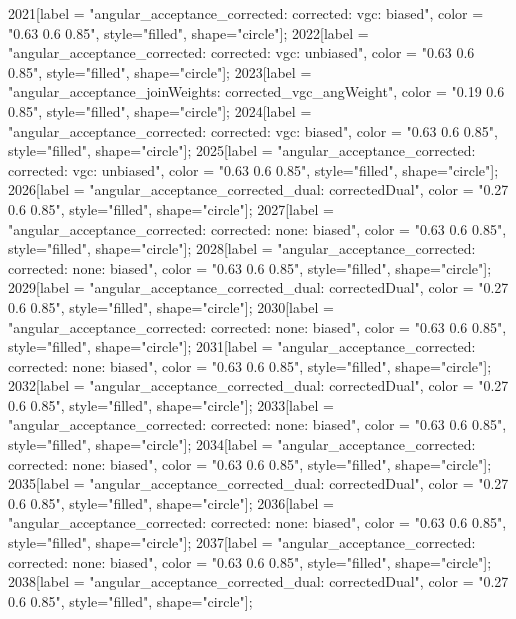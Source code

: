 {	2021[label = "angular_acceptance_corrected\nangacc: corrected\ncsp: vgc\ntrigger: biased", color = "0.63 0.6 0.85", style="filled", shape="circle"];
	2022[label = "angular_acceptance_corrected\nangacc: corrected\ncsp: vgc\ntrigger: unbiased", color = "0.63 0.6 0.85", style="filled", shape="circle"];
	2023[label = "angular_acceptance_joinWeights\nwflag: corrected_vgc_angWeight", color = "0.19 0.6 0.85", style="filled", shape="circle"];
	2024[label = "angular_acceptance_corrected\nangacc: corrected\ncsp: vgc\ntrigger: biased", color = "0.63 0.6 0.85", style="filled", shape="circle"];
	2025[label = "angular_acceptance_corrected\nangacc: corrected\ncsp: vgc\ntrigger: unbiased", color = "0.63 0.6 0.85", style="filled", shape="circle"];
	2026[label = "angular_acceptance_corrected_dual\nstep: correctedDual", color = "0.27 0.6 0.85", style="filled", shape="circle"];
	2027[label = "angular_acceptance_corrected\nangacc: corrected\ncsp: none\ntrigger: biased", color = "0.63 0.6 0.85", style="filled", shape="circle"];
	2028[label = "angular_acceptance_corrected\nangacc: corrected\ncsp: none\ntrigger: biased", color = "0.63 0.6 0.85", style="filled", shape="circle"];
	2029[label = "angular_acceptance_corrected_dual\nstep: correctedDual", color = "0.27 0.6 0.85", style="filled", shape="circle"];
	2030[label = "angular_acceptance_corrected\nangacc: corrected\ncsp: none\ntrigger: biased", color = "0.63 0.6 0.85", style="filled", shape="circle"];
	2031[label = "angular_acceptance_corrected\nangacc: corrected\ncsp: none\ntrigger: biased", color = "0.63 0.6 0.85", style="filled", shape="circle"];
	2032[label = "angular_acceptance_corrected_dual\nstep: correctedDual", color = "0.27 0.6 0.85", style="filled", shape="circle"];
	2033[label = "angular_acceptance_corrected\nangacc: corrected\ncsp: none\ntrigger: biased", color = "0.63 0.6 0.85", style="filled", shape="circle"];
	2034[label = "angular_acceptance_corrected\nangacc: corrected\ncsp: none\ntrigger: biased", color = "0.63 0.6 0.85", style="filled", shape="circle"];
	2035[label = "angular_acceptance_corrected_dual\nstep: correctedDual", color = "0.27 0.6 0.85", style="filled", shape="circle"];
	2036[label = "angular_acceptance_corrected\nangacc: corrected\ncsp: none\ntrigger: biased", color = "0.63 0.6 0.85", style="filled", shape="circle"];
	2037[label = "angular_acceptance_corrected\nangacc: corrected\ncsp: none\ntrigger: biased", color = "0.63 0.6 0.85", style="filled", shape="circle"];
	2038[label = "angular_acceptance_corrected_dual\nstep: correctedDual", color = "0.27 0.6 0.85", style="filled", shape="circle"];
}
